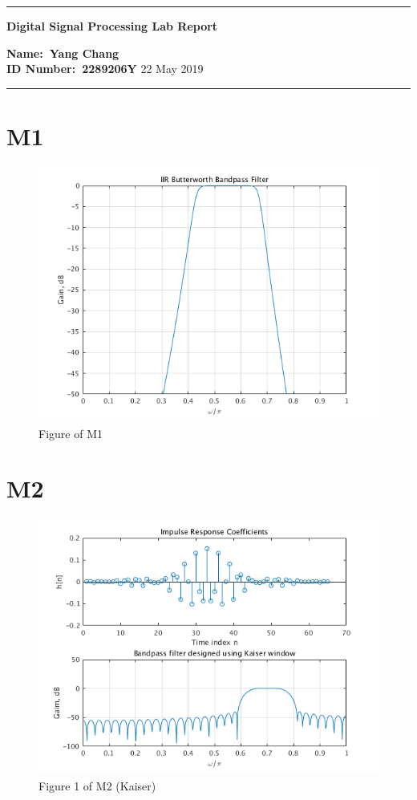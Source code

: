 \documentclass[11pt,a4paper,twoside]{article}
\begin{document}
\begin{center}
\hrule

\vspace{.4cm}
{\bf {\Huge Digital Signal Processing Lab Report}}
\vspace{.2cm}
\end{center}
{\bf Name:\ Yang Chang }  \\
{\bf ID Number:\ 2289206Y} \hspace{\fill} 22 May 2019 \\
\hrule

\section{M1}



\begin{figure}[H]
\centering
\includegraphics[width=0.8\linewidth]{img/m1}
\caption{Figure of M1}
\label{Figure of M1}
\end{figure}


\section{M2}





\begin{figure}[H]
\centering
\includegraphics[width=0.8\linewidth]{img/m2_1}
\caption{Figure 1 of M2 (Kaiser)}
\label{Figure 1 of M2}
\end{figure}
\end{document}
